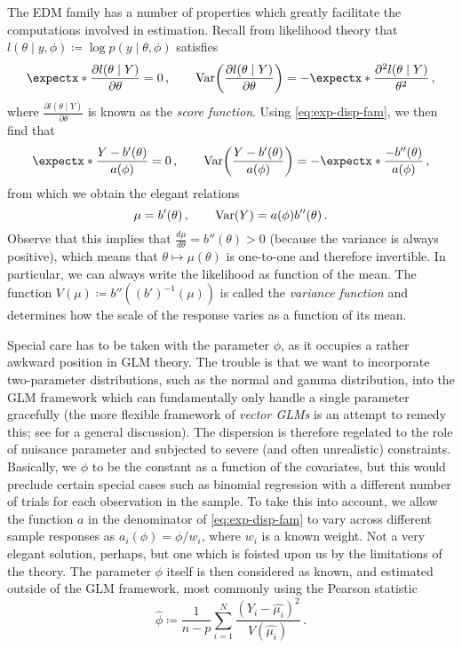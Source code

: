 \documentclass[a4paper]{book}
\begin{document}
The EDM family has a number of properties which greatly facilitate the computations involved in estimation. Recall from likelihood theory that $l(\theta \mid y, \phi) \coloneqq \log p(y \mid \theta, \phi)$ satisfies
\begin{equation} \label{eq:exp-var-likelihood}
  \expect{\frac{\partial l(\theta \mid Y)}{\partial \theta}} = 0 \,, \qquad \var{\frac{\partial l(\theta \mid Y)}{\partial \theta}} = -\expect{\frac{\partial^2 l(\theta \mid Y)}{\theta^2}} \,,
\end{equation}
where $\frac{\partial l(\theta \mid Y)}{\partial \theta}$ is known as the \emph{score function}. Using \cref{eq:exp-disp-fam}, we then find that
\begin{equation}
  \expect{\frac{Y - b'(\theta)}{a(\phi)}} = 0 \,, \qquad \var{\frac{Y - b'(\theta)}{a(\phi)}} = -\expect{\frac{-b''(\theta)}{a(\phi)}} \,,
\end{equation}
from which we obtain the elegant relations
\begin{equation}
  \mu = b'(\theta) \,, \qquad \var{Y} = a(\phi) b''(\theta) \,.
\end{equation}
Observe that this implies that $\frac{d \mu}{d \theta} = b''(\theta) > 0$ (because the variance is always positive), which means that $\theta \mapsto \mu(\theta)$ is one-to-one and therefore invertible. In particular, we can always write the likelihood as function of the mean. The function $V(\mu) \coloneqq b''((b')^{-1}(\mu))$ is called the \emph{variance function} and determines how the scale of the response varies as a function of its mean. 

Special care has to be taken with the parameter $\phi$, as it occupies a rather awkward position in GLM theory. The trouble is that we want to incorporate two-parameter distributions, such as the normal and gamma distribution, into the GLM framework which can fundamentally only handle a single parameter gracefully (the more flexible framework of \emph{vector GLMs} is an attempt to remedy this; see \cite[Chapter 2]{yee} for a general discussion). The dispersion is therefore regelated to the role of nuisance parameter and subjected to severe (and often unrealistic) constraints. Basically, we $\phi$ to be the constant as a function of the covariates, but this would preclude certain special cases such as binomial regression with a different number of trials for each observation in the sample. To take this into account, we allow the function $a$ in the denominator of \cref{eq:exp-disp-fam} to vary across different sample responses as $a_i(\phi) = \phi / w_i$, where $w_i$ is a known weight. Not a very elegant solution, perhaps, but one which is foisted upon us by the limitations of the theory. The parameter $\phi$ itself is then considered as known, and estimated outside of the GLM framework, most commonly using the Pearson statistic
\begin{equation}
  \widehat{\phi} \coloneqq \frac{1}{n - p} \sum_{i = 1}^N \frac{(Y_i - \widehat{\mu_i})^2}{V(\widehat{\mu_i})} \,.
\end{equation}
\end{document}
